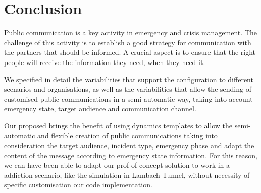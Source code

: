 \section{Conclusion}\label{sec:conclusion}

Public communication is a key activity in emergency and crisis management. The challenge of this activity is to establish a good strategy for communication with the partners that should be informed. A crucial aspect is to ensure that the right people will receive the information they need, when they need it.

We specified in detail the variabilities that support the configuration to different scenarios and organisations, as well as the variabilities that allow the sending of customised public communications in a semi-automatic way, taking into account emergency state, target audience and communication channel.

Our proposed brings the benefit of using dynamics templates to allow the semi-automatic and flexible creation of public communications taking into consideration the target audience, incident type, emergency phase and adapt the content of the message according to emergency state information. For this reason, we can have been able to adapt our prof of concept solution to work in a addiction scenario, like the simulation in Lambach Tunnel, without necessity of specific customisation our code implementation.   

